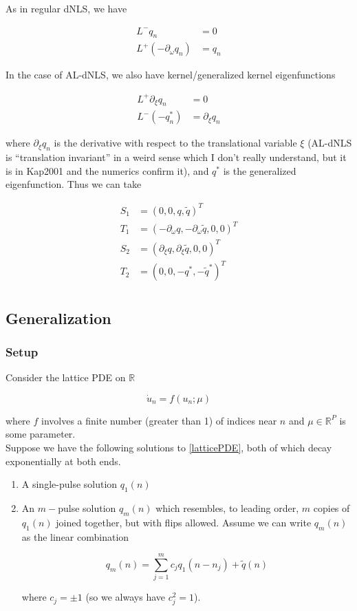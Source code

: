\documentclass[12pt]{article}
\def\R{{\mathbb R}}
\begin{document}
As in regular dNLS, we have

\begin{align*}
L^- q_n &= 0 \\
L^+(-\partial_\omega q_n) &= q_n 
\end{align*}

In the case of AL-dNLS, we also have kernel/generalized kernel eigenfunctions

\begin{align*}
L^+ \partial_\xi q_n &= 0 \\
L^- (-q^*_n) &= \partial_\xi q_n
\end{align*}

where $\partial_\xi q_n$ is the derivative with respect to the translational variable $\xi$ (AL-dNLS is ``translation invariant'' in a weird sense which I don't really understand, but it is in Kap2001 and the numerics confirm it), and $q^*$ is the generalized eigenfunction. Thus we can take

\begin{align*}
S_1 &= (0, 0, q, \tilde{q})^T \\
T_1 &= (-\partial_\omega q, -\partial_\omega \tilde{q}, 0, 0)^T \\
S_2 &= (\partial_\xi q, \partial_\xi \tilde{q}, 0, 0)^T \\
T_2 &= (0, 0, -q^*, -\tilde{q}^*)^T \\
\end{align*}

\subsection{Generalization}

\subsubsection{Setup}

Consider the lattice PDE on $\R$

\begin{equation}\label{latticePDE}
\dot{u}_n = f(u_n; \mu)
\end{equation}

where $f$ involves a finite number (greater than 1) of indices near $n$ and $\mu \in \R^P$ is some parameter.\\

Suppose we have the following solutions to \eqref{latticePDE}, both of which decay exponentially at both ends.

\begin{enumerate}
\item A single-pulse solution $q_1(n)$
\item An $m-$pulse solution $q_m(n)$ which resembles, to leading order, $m$ copies of $q_1(n)$ joined together, but with flips allowed. Assume we can write $q_m(n)$ as the linear combination

\begin{equation}\label{qm}
q_m(n) = \sum_{j = 1}^m c_j q_1(n - n_j) + \tilde{q}(n)
\end{equation}

where $c_j = \pm 1$ (so we always have $c_j^2 = 1$).
\end{enumerate}
\end{document}
